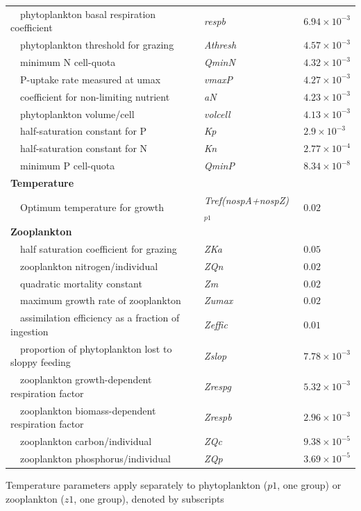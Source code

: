 \documentclass[review]{elsarticle}\usepackage[]{graphicx}\usepackage[]{color}
\begin{document}
\begin{table}[!tbp]
{\begin{center}
\begin{tabular}{lll}
~~phytoplankton basal respiration coefficient&\textit{respb}&$6.94\times 10^{-3}$\tabularnewline
~~phytoplankton threshold for grazing&\textit{Athresh}&$4.57\times 10^{-3}$\tabularnewline
~~minimum N cell-quota&\textit{QminN}&$4.32\times 10^{-3}$\tabularnewline
~~P-uptake rate measured at umax&\textit{vmaxP}&$4.27\times 10^{-3}$\tabularnewline
~~coefficient for non-limiting nutrient&\textit{aN}&$4.23\times 10^{-3}$\tabularnewline
~~phytoplankton volume/cell&\textit{volcell}&$4.13\times 10^{-3}$\tabularnewline
~~half-saturation constant for P&\textit{Kp}&$2.9\times 10^{-3}$\tabularnewline
~~half-saturation constant for N&\textit{Kn}&$2.77\times 10^{-4}$\tabularnewline
~~minimum P cell-quota&\textit{QminP}&$8.34\times 10^{-8}$\tabularnewline
\hline
{\bfseries Temperature}&&\tabularnewline
~~Optimum temperature for growth&\textit{Tref(nospA+nospZ)$_{p1}$}&$0.02$\tabularnewline
\hline
{\bfseries Zooplankton}&&\tabularnewline
~~half saturation coefficient for grazing&\textit{ZKa}&$0.05$\tabularnewline
~~zooplankton nitrogen/individual&\textit{ZQn}&$0.02$\tabularnewline
~~quadratic mortality constant&\textit{Zm}&$0.02$\tabularnewline
~~maximum growth rate of zooplankton&\textit{Zumax}&$0.02$\tabularnewline
~~assimilation efficiency as a fraction of ingestion&\textit{Zeffic}&$0.01$\tabularnewline
~~proportion of phytoplankton lost to sloppy feeding&\textit{Zslop}&$7.78\times 10^{-3}$\tabularnewline
~~zooplankton growth-dependent respiration factor&\textit{Zrespg}&$5.32\times 10^{-3}$\tabularnewline
~~zooplankton biomass-dependent respiration factor&\textit{Zrespb}&$2.96\times 10^{-3}$\tabularnewline
~~zooplankton carbon/individual&\textit{ZQc}&$9.38\times 10^{-5}$\tabularnewline
~~zooplankton phosphorus/individual&\textit{ZQp}&$3.69\times 10^{-5}$\tabularnewline
\hline
\end{tabular}\end{center}}
\footnotesize *Temperature parameters apply separately to phytoplankton ($p1$, one group) or zooplankton ($z1$, one group), denoted by subscripts\end{table}
\end{document}
